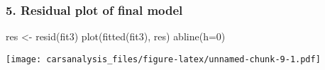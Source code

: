 \documentclass[
]{article}
\newenvironment{Shaded}{\begin{snugshade}}{\end{snugshade}}
\newcommand{\AttributeTok}[1]{\textcolor[rgb]{0.77,0.63,0.00}{#1}}
\newcommand{\DecValTok}[1]{\textcolor[rgb]{0.00,0.00,0.81}{#1}}
\newcommand{\FunctionTok}[1]{\textcolor[rgb]{0.00,0.00,0.00}{#1}}
\newcommand{\NormalTok}[1]{#1}
\newcommand{\OtherTok}[1]{\textcolor[rgb]{0.56,0.35,0.01}{#1}}
\begin{document}
\hypertarget{residual-plot-of-final-model}{%
\subsubsection{5. Residual plot of final
model}\label{residual-plot-of-final-model}}

\begin{Shaded}
\begin{Highlighting}[]
\NormalTok{res }\OtherTok{\textless{}{-}} \FunctionTok{resid}\NormalTok{(fit3)}
\FunctionTok{plot}\NormalTok{(}\FunctionTok{fitted}\NormalTok{(fit3), res)}
\FunctionTok{abline}\NormalTok{(}\AttributeTok{h=}\DecValTok{0}\NormalTok{)}
\end{Highlighting}
\end{Shaded}

\texttt{[image: carsanalysis\_files/figure-latex/unnamed-chunk-9-1.pdf]}
\end{document}
